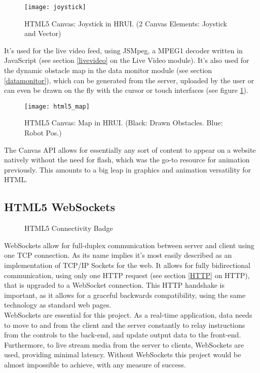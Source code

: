 \begin{figure}[h]
\begin{center}
  \texttt{[image: joystick]}
  \end{center}
  \caption{HTML5 Canvas: Joystick in HRUI. (2 Canvas Elements: Joystick and Vector)}
\end{figure}
It's used for the live video feed, using JSMpeg, a MPEG1 decoder written in JavaScript (see section \ref{livevideo} on the
Live Video module). It's also used for the dynamic obstacle map in the data monitor module (see section \ref{datamonitor}),
which can be generated from the server, uploaded by the user or can even be drawn on the fly with the cursor or touch
interfaces (see figure \ref{html5_map}).\\

\begin{figure}[h]
\begin{center}
  \texttt{[image: html5\_map]}
  \end{center}
  \caption{HTML5 Canvas: Map in HRUI. (Black: Drawn Obstacles. Blue: Robot Pos.)\label{html5_map}}
\end{figure}
The Canvas API allows for essentially any sort of content to appear on a website natively without the need for flash, which
was the go-to resource for animation previously. This amounts to a big leap in graphics and animation versatility for HTML.\\

\subsection{HTML5 WebSockets} \label{html5websockets}
\begin{figure}[h]
\centering

\caption{HTML5 Connectivity Badge}
\end{figure}
WebSockets allow for full-duplex communication between server and client using one TCP connection. As its name implies it's
most easily described as an implementation of TCP/IP Sockets for the web. It allows for fully bidirectional communication,
using only one HTTP request (see section \ref{HTTP} on HTTP), that is upgraded to a WebSocket connection. This HTTP handshake
is important, as it allows for a graceful backwards compatibility, using the same technology as standard web pages.\\

WebSockets are essential for this project. As a real-time application, data needs to move to and from the client and the
server constantly to relay instructions from the controls to the back-end, and update output data to the front-end.
Furthermore, to live stream media from the server to clients, WebSockets are used, providing minimal latency. Without
WebSockets this project would be almost impossible to achieve, with any measure of success.\\

